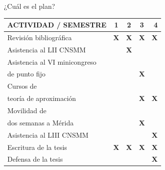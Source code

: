 \begin{frame}[t,fragile]{¿Cuál es el plan?}
	


\begin{tabular}{ |l | c | c | c |  r | }
	\hline
	\textbf{ACTIVIDAD / SEMESTRE} & \textbf{ 1 } & \textbf{2} & \textbf{3} & \textbf{4}   \\
	\hline 
	Revisión bibliográfica & \textbf{X} & \textbf{X} & \textbf{X} &    \textbf{X}   \\
	\hline 
	Asistencia al LII CNSMM  &  & \textbf{X} &  &       \\
	\hline 
	Asistencia al VI minicongreso &  &  &   &   \\
	de punto fijo &  &  & \textbf{X}  &       \\
	\hline 
	Cursos de  &  &  &   &       \\
	 teoría de aproximación	  &  &  & \textbf{X} &  \textbf{X}    \\
	\hline 
	Movilidad de   &  &  &   &       \\
	 
	 dos semanas a Mérida  &  &  & \textbf{X}  &       \\
	\hline 
	Asistencia al LIII CNSMM  &  &  &  &   \textbf{X}    \\
	\hline 
	Escritura  de la tesis & \textbf{X}  & \textbf{X} & \textbf{X} &    \textbf{X}    \\
	\hline 
	Defensa de la tesis &  &  &  &  \textbf{X}    \\
	\hline 
	
\end{tabular}




\end{frame}
